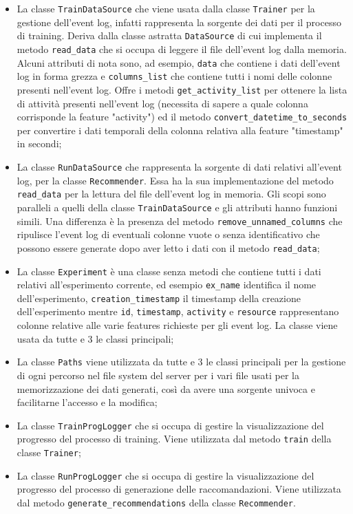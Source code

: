 \begin{itemize}
\item La classe \texttt{TrainDataSource} che viene usata dalla classe \texttt{Trainer} per la gestione dell'event log, infatti rappresenta la sorgente dei dati per il processo di training. Deriva dalla classe astratta \texttt{DataSource} di cui implementa il metodo \texttt{read\_data} che si occupa di leggere il file dell'event log dalla memoria. Alcuni attributi di nota sono, ad esempio, \texttt{data} che contiene i dati dell'event log in forma grezza e \texttt{columns\_list} che contiene tutti i nomi delle colonne presenti nell'event log. Offre i metodi \texttt{get\_activity\_list} per ottenere la lista di attività presenti nell'event log (necessita di sapere a quale colonna corrisponde la feature "activity") ed il metodo \texttt{convert\_datetime\_to\_seconds} per convertire i dati temporali della colonna relativa alla feature "timestamp" in secondi;

\item La classe \texttt{RunDataSource} che rappresenta la sorgente di dati relativi all'event log, per la classe \texttt{Recommender}. Essa ha la sua implementazione del metodo \texttt{read\_data} per la lettura del file dell'event log in memoria. Gli scopi sono paralleli a quelli della classe \texttt{TrainDataSource} e gli attributi hanno funzioni simili. Una differenza è la presenza del metodo \texttt{remove\_unnamed\_columns} che ripulisce l'event log di eventuali colonne vuote o senza identificativo che possono essere generate dopo aver letto i dati con il metodo \texttt{read\_data};

\item La classe \texttt{Experiment} è una classe senza metodi che contiene tutti i dati relativi all'esperimento corrente, ed esempio \texttt{ex\_name} identifica il nome dell'esperimento, \texttt{creation\_timestamp} il timestamp della creazione dell'esperimento mentre \texttt{id}, \texttt{timestamp}, \texttt{activity} e \texttt{resource} rappresentano colonne relative alle varie features richieste per gli event log. La classe viene usata da tutte e 3 le classi principali;

\item La classe \texttt{Paths} viene utilizzata da tutte e 3 le classi principali per la gestione di ogni percorso nel file system del server per i vari file usati per la memorizzazione dei dati generati, così da avere una sorgente univoca e facilitarne l'accesso e la modifica;

\item La classe \texttt{TrainProgLogger} che si occupa di gestire la visualizzazione del progresso del processo di training. Viene utilizzata dal metodo \texttt{train} della classe \texttt{Trainer};

\item La classe \texttt{RunProgLogger} che si occupa di gestire la visualizzazione del progresso del processo di generazione delle raccomandazioni. Viene utilizzata dal metodo \texttt{generate\_recommendations} della classe \texttt{Recommender}.

\end{itemize}


